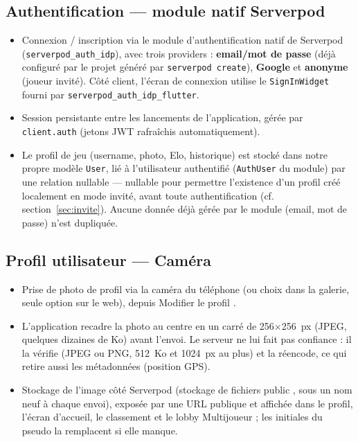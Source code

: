 \documentclass[a4paper,11pt]{article}
\begin{document}
\subsection{Authentification --- module natif Serverpod}
\begin{itemize}[leftmargin=1.5em]
  \item Connexion / inscription via le module d'authentification natif de Serverpod
        (\texttt{serverpod\_auth\_idp}), avec trois providers : \textbf{email/mot de
        passe} (déjà configuré par le projet généré par \texttt{serverpod create}),
        \textbf{Google} et \textbf{anonyme} (joueur invité). Côté client,
        l'écran de connexion utilise le \texttt{SignInWidget} fourni par
        \texttt{serverpod\_auth\_idp\_flutter}.
  \item Session persistante entre les lancements de l'application, gérée par
        \texttt{client.auth} (jetons JWT rafraîchis automatiquement).
  \item Le profil de jeu (username, photo, Elo, historique) est stocké dans notre
        propre modèle \texttt{User}, lié à l'utilisateur authentifié
        (\texttt{AuthUser} du module) par une relation nullable --- nullable pour
        permettre l'existence d'un profil créé localement en mode invité, avant toute
        authentification (cf. section~\ref{sec:invite}). Aucune donnée déjà gérée par
        le module (email, mot de passe) n'est dupliquée.
\end{itemize}

\subsection{Profil utilisateur --- Caméra}
\begin{itemize}[leftmargin=1.5em]
  \item Prise de photo de profil via la caméra du téléphone (ou choix dans la
        galerie, seule option sur le web), depuis \og Modifier le profil \fg{}.
  \item L'application recadre la photo au centre en un carré de
        256$\times$256~px (JPEG, quelques dizaines de Ko) avant l'envoi. Le
        serveur ne lui fait pas confiance : il la vérifie (JPEG ou PNG,
        512~Ko et 1024~px au plus) et la réencode, ce qui retire aussi les
        métadonnées (position GPS).
  \item Stockage de l'image côté Serverpod (stockage de fichiers \og public \fg{},
        sous un nom neuf à chaque envoi), exposée par une URL publique et
        affichée dans le profil, l'écran d'accueil, le classement et le
        lobby Multijoueur ; les initiales du pseudo la remplacent si elle
        manque.
\end{itemize}
\end{document}
